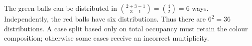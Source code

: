 The green balls can be distributed in $\binom{2+3-1}{3-1}=\binom42=6$ ways. Independently, the red balls have six distributions. Thus there are $6^2=\boxed{36}$ distributions. A case split based only on total occupancy must retain the colour composition; otherwise some cases receive an incorrect multiplicity.

